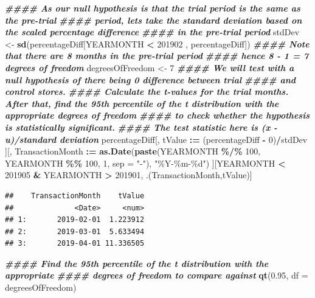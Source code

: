 \documentclass[
]{article}
\newenvironment{Shaded}{\begin{snugshade}}{\end{snugshade}}
\newcommand{\AttributeTok}[1]{\textcolor[rgb]{0.13,0.29,0.53}{#1}}
\newcommand{\DecValTok}[1]{\textcolor[rgb]{0.00,0.00,0.81}{#1}}
\newcommand{\DocumentationTok}[1]{\textcolor[rgb]{0.56,0.35,0.01}{\textbf{\textit{#1}}}}
\newcommand{\FloatTok}[1]{\textcolor[rgb]{0.00,0.00,0.81}{#1}}
\newcommand{\FunctionTok}[1]{\textcolor[rgb]{0.13,0.29,0.53}{\textbf{#1}}}
\newcommand{\NormalTok}[1]{#1}
\newcommand{\OtherTok}[1]{\textcolor[rgb]{0.56,0.35,0.01}{#1}}
\newcommand{\SpecialCharTok}[1]{\textcolor[rgb]{0.81,0.36,0.00}{\textbf{#1}}}
\newcommand{\StringTok}[1]{\textcolor[rgb]{0.31,0.60,0.02}{#1}}
\begin{document}
\begin{Shaded}
\begin{Highlighting}[]
\DocumentationTok{\#\#\#\# As our null hypothesis is that the trial period is the same as the pre{-}trial}
\DocumentationTok{\#\#\#\# period, let\textquotesingle{}s take the standard deviation based on the scaled percentage difference}
\DocumentationTok{\#\#\#\# in the pre{-}trial period}
\NormalTok{stdDev }\OtherTok{\textless{}{-}} \FunctionTok{sd}\NormalTok{(percentageDiff[YEARMONTH }\SpecialCharTok{\textless{}} \DecValTok{201902}\NormalTok{ , percentageDiff])}
\DocumentationTok{\#\#\#\# Note that there are 8 months in the pre{-}trial period}
\DocumentationTok{\#\#\#\# hence 8 {-} 1 = 7 degrees of freedom}
\NormalTok{degreesOfFreedom }\OtherTok{\textless{}{-}} \DecValTok{7}
\DocumentationTok{\#\#\#\# We will test with a null hypothesis of there being 0 difference between trial}
\DocumentationTok{\#\#\#\# and control stores.}
\DocumentationTok{\#\#\#\# Calculate the t{-}values for the trial months. After that, find the 95th percentile of the t distribution with the appropriate degrees of freedom}
\DocumentationTok{\#\#\#\# to check whether the hypothesis is statistically significant.}
\DocumentationTok{\#\#\#\# The test statistic here is (x {-} u)/standard deviation}
\NormalTok{percentageDiff[, tValue }\SpecialCharTok{:=}\NormalTok{ (percentageDiff }\SpecialCharTok{{-}} \DecValTok{0}\NormalTok{)}\SpecialCharTok{/}\NormalTok{stdDev}
\NormalTok{               ][, TransactionMonth }\SpecialCharTok{:=} \FunctionTok{as.Date}\NormalTok{(}\FunctionTok{paste}\NormalTok{(YEARMONTH }\SpecialCharTok{\%/\%} \DecValTok{100}\NormalTok{, YEARMONTH }\SpecialCharTok{\%\%} \DecValTok{100}\NormalTok{, }\DecValTok{1}\NormalTok{, }
                                                     \AttributeTok{sep =} \StringTok{"{-}"}\NormalTok{), }\StringTok{"\%Y{-}\%m{-}\%d"}\NormalTok{)}
\NormalTok{][YEARMONTH }\SpecialCharTok{\textless{}} \DecValTok{201905} \SpecialCharTok{\&}\NormalTok{ YEARMONTH }\SpecialCharTok{\textgreater{}} \DecValTok{201901}\NormalTok{, .(TransactionMonth,tValue)]}
\end{Highlighting}
\end{Shaded}

\begin{verbatim}
##    TransactionMonth    tValue
##              <Date>     <num>
## 1:       2019-02-01  1.223912
## 2:       2019-03-01  5.633494
## 3:       2019-04-01 11.336505
\end{verbatim}

\begin{Shaded}
\begin{Highlighting}[]
\DocumentationTok{\#\#\#\# Find the 95th percentile of the t distribution with the appropriate}
\DocumentationTok{\#\#\#\# degrees of freedom to compare against}
\FunctionTok{qt}\NormalTok{(}\FloatTok{0.95}\NormalTok{, }\AttributeTok{df =}\NormalTok{ degreesOfFreedom)}
\end{Highlighting}
\end{Shaded}
\end{document}
